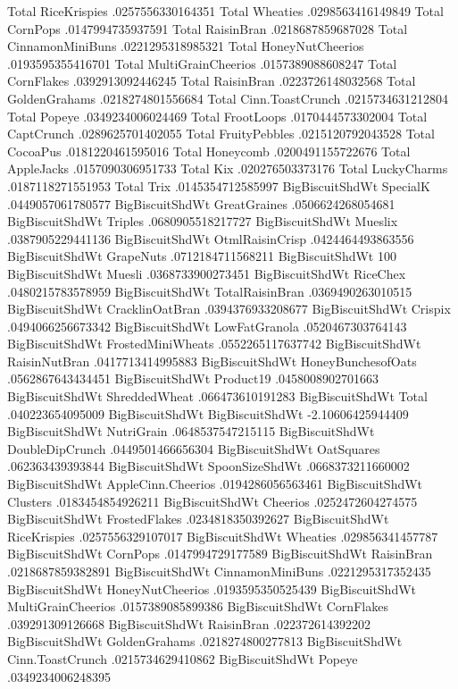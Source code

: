 Total	RiceKrispies	.0257556330164351
Total	Wheaties	.0298563416149849
Total	CornPops	.0147994735937591
Total	RaisinBran	.0218687859687028
Total	CinnamonMiniBuns	.0221295318985321
Total	HoneyNutCheerios	.0193595355416701
Total	MultiGrainCheerios	.0157389088608247
Total	CornFlakes	.0392913092446245
Total	RaisinBran	.0223726148032568
Total	GoldenGrahams	.0218274801556684
Total	Cinn.ToastCrunch	.0215734631212804
Total	Popeye	.0349234006024469
Total	FrootLoops	.0170444573302004
Total	CaptCrunch	.0289625701402055
Total	FruityPebbles	.0215120792043528
Total	CocoaPus	.0181220461595016
Total	Honeycomb	.0200491155722676
Total	AppleJacks	.0157090306951733
Total	Kix	.020276503373176
Total	LuckyCharms	.0187118271551953
Total	Trix	.0145354712585997
BigBiscuitShdWt	SpecialK	.0449057061780577
BigBiscuitShdWt	GreatGraines	.0506624268054681
BigBiscuitShdWt	Triples	.0680905518217727
BigBiscuitShdWt	Mueslix	.0387905229441136
BigBiscuitShdWt	OtmlRaisinCrisp	.0424464493863556
BigBiscuitShdWt	GrapeNuts	.0712184711568211
BigBiscuitShdWt	100%
BigBiscuitShdWt	Muesli	.0368733900273451
BigBiscuitShdWt	RiceChex	.0480215783578959
BigBiscuitShdWt	TotalRaisinBran	.0369490263010515
BigBiscuitShdWt	CracklinOatBran	.0394376933208677
BigBiscuitShdWt	Crispix	.0494066256673342
BigBiscuitShdWt	LowFatGranola	.0520467303764143
BigBiscuitShdWt	FrostedMiniWheats	.0552265117637742
BigBiscuitShdWt	RaisinNutBran	.0417713414995883
BigBiscuitShdWt	HoneyBunchesofOats	.0562867643434451
BigBiscuitShdWt	Product19	.0458008902701663
BigBiscuitShdWt	ShreddedWheat	.066473610191283
BigBiscuitShdWt	Total	.040223654095009
BigBiscuitShdWt	BigBiscuitShdWt	-2.10606425944409
BigBiscuitShdWt	NutriGrain	.0648537547215115
BigBiscuitShdWt	DoubleDipCrunch	.0449501466656304
BigBiscuitShdWt	OatSquares	.062363439393844
BigBiscuitShdWt	SpoonSizeShdWt	.0668373211660002
BigBiscuitShdWt	AppleCinn.Cheerios	.0194286056563461
BigBiscuitShdWt	Clusters	.0183454854926211
BigBiscuitShdWt	Cheerios	.0252472604274575
BigBiscuitShdWt	FrostedFlakes	.0234818350392627
BigBiscuitShdWt	RiceKrispies	.0257556329107017
BigBiscuitShdWt	Wheaties	.029856341457787
BigBiscuitShdWt	CornPops	.0147994729177589
BigBiscuitShdWt	RaisinBran	.0218687859382891
BigBiscuitShdWt	CinnamonMiniBuns	.0221295317352435
BigBiscuitShdWt	HoneyNutCheerios	.0193595350525439
BigBiscuitShdWt	MultiGrainCheerios	.0157389085899386
BigBiscuitShdWt	CornFlakes	.039291309126668
BigBiscuitShdWt	RaisinBran	.022372614392202
BigBiscuitShdWt	GoldenGrahams	.0218274800277813
BigBiscuitShdWt	Cinn.ToastCrunch	.0215734629410862
BigBiscuitShdWt	Popeye	.0349234006248395
